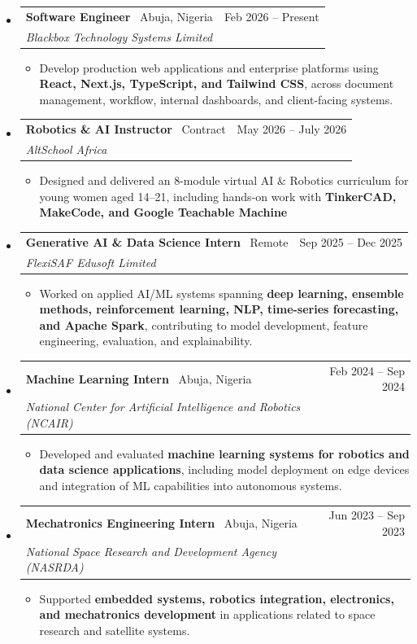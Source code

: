 \documentclass[11pt,a4paper]{article}
\makeatletter
\newcommand{\resumeSubheading}[5]{
  \vspace{2pt}
  \item[]
    \begin{tabular*}{\textwidth}[t]{l@{\extracolsep{\fill}}r}
      \textbf{#1} \textnormal{ \textbar\ #4} & #2 \\ %
      \textit{#3} & \\ %
    \end{tabular*}
    #5
  \vspace{-8pt}
}
\makeatother
\begin{document}
\begin{itemize}[leftmargin=0pt, label={}]

\resumeSubheading
  {Software Engineer}{Feb 2026 -- Present}
  {Blackbox Technology Systems Limited}{Abuja, Nigeria}
  {
  \begin{itemize}[leftmargin=15pt, label=\textbullet]
    \item Develop production web applications and enterprise platforms using \textbf{React, Next.js, TypeScript, and Tailwind CSS}, across document management, workflow, internal dashboards, and client-facing systems.
  \end{itemize}
  }

\resumeSubheading
  {Robotics \& AI Instructor}{May 2026 -- July 2026}
  {AltSchool Africa}{Contract}
  {
  \begin{itemize}[leftmargin=15pt, label=\textbullet]
    \item Designed and delivered an 8-module virtual AI \& Robotics curriculum for young women aged 14–21, including hands-on work with \textbf{TinkerCAD, MakeCode, and Google Teachable Machine}
  \end{itemize}
  }

\resumeSubheading
  {Generative AI \& Data Science Intern}{Sep 2025 -- Dec 2025}
  {FlexiSAF Edusoft Limited}{Remote}
  {
  \begin{itemize}[leftmargin=15pt, label=\textbullet]
    \item Worked on applied AI/ML systems spanning \textbf{deep learning, ensemble methods, reinforcement learning, NLP, time-series forecasting, and Apache Spark}, contributing to model development, feature engineering, evaluation, and explainability.
  \end{itemize}
  }

\resumeSubheading
  {Machine Learning Intern}{Feb 2024 -- Sep 2024}
  {National Center for Artificial Intelligence and Robotics (NCAIR)}{Abuja, Nigeria}
  {
  \begin{itemize}[leftmargin=15pt, label=\textbullet]
    \item Developed and evaluated \textbf{machine learning systems for robotics and data science applications}, including model deployment on edge devices and integration of ML capabilities into autonomous systems.
  \end{itemize}
  }

\resumeSubheading
  {Mechatronics Engineering Intern}{Jun 2023 -- Sep 2023}
  {National Space Research and Development Agency (NASRDA)}{Abuja, Nigeria}
  {
  \begin{itemize}[leftmargin=15pt, label=\textbullet]
    \item Supported \textbf{embedded systems, robotics integration, electronics, and mechatronics development} in applications related to space research and satellite systems.
  \end{itemize}
  }

\end{itemize}
\end{document}
